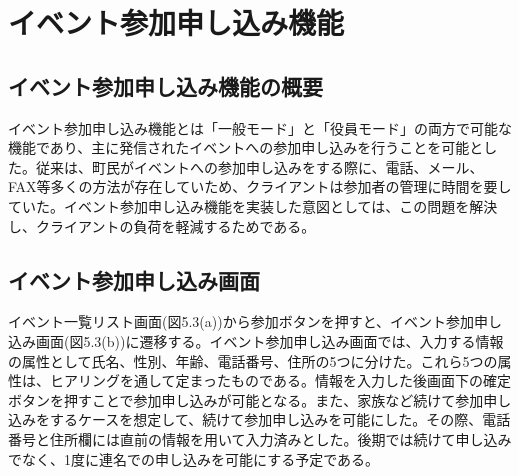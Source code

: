 \section{イベント参加申し込み機能}%
\subsection{イベント参加申し込み機能の概要}%
イベント参加申し込み機能とは「一般モード」と「役員モード」の両方で可能な機能であり、主に発信されたイベントへの参加申し込みを行うことを可能とした。従来は、町民がイベントへの参加申し込みをする際に、電話、メール、FAX等多くの方法が存在していため、クライアントは参加者の管理に時間を要していた。イベント参加申し込み機能を実装した意図としては、この問題を解決し、クライアントの負荷を軽減するためである。
​
\subsection{イベント参加申し込み画面}%
イベント一覧リスト画面(図5.3(a))から参加ボタンを押すと、イベント参加申し込み画面(図5.3(b))に遷移する。イベント参加申し込み画面では、入力する情報の属性として氏名、性別、年齢、電話番号、住所の5つに分けた。これら5つの属性は、ヒアリングを通して定まったものである。情報を入力した後画面下の確定ボタンを押すことで参加申し込みが可能となる。また、家族など続けて参加申し込みをするケースを想定して、続けて参加申し込みを可能にした。その際、電話番号と住所欄には直前の情報を用いて入力済みとした。後期では続けて申し込みでなく、1度に連名での申し込みを可能にする予定である。
​
